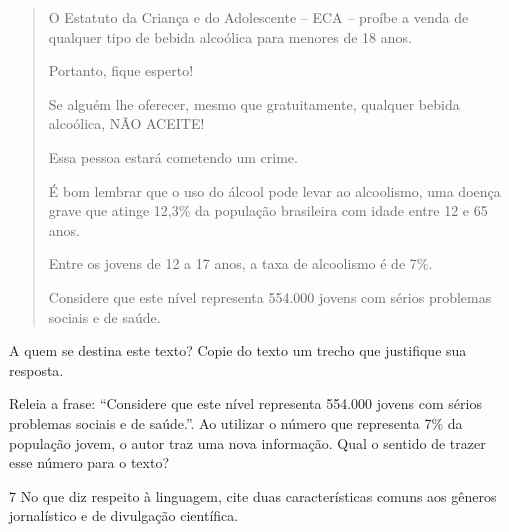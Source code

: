 \begin{quote}
O Estatuto da Criança e do Adolescente -- ECA -- proíbe a venda de
qualquer tipo de bebida alcoólica para menores de 18 anos.

Portanto, fique esperto!

Se alguém lhe oferecer, mesmo que gratuitamente, qualquer bebida
alcoólica, NÃO ACEITE!

Essa pessoa estará cometendo um crime.

É bom lembrar que o uso do álcool pode levar ao alcoolismo, uma doença
grave que atinge 12,3\% da população brasileira com idade entre 12 e 65
anos.

Entre os jovens de 12 a 17 anos, a taxa de alcoolismo é de 7\%.

Considere que este nível representa 554.000 jovens com sérios problemas
sociais e de saúde.

\end{quote}


\begin{escolha}
  \item A quem se destina este texto? Copie do texto um trecho que justifique
  sua resposta.


  \item Releia a frase: ``Considere que este nível representa 554.000 jovens
  com sérios problemas sociais e de saúde.''. Ao utilizar o número que
  representa 7\% da população jovem, o autor traz uma nova informação.
  Qual o sentido de trazer esse número para o texto?


\end{escolha}

\num{7} No que diz respeito à linguagem, cite duas características comuns aos gêneros
jornalístico e de divulgação científica.


